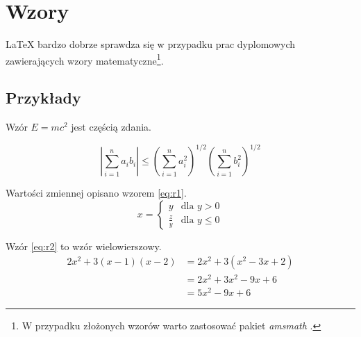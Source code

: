 \section{Wzory}
\LaTeX{} bardzo dobrze sprawdza się w przypadku prac dyplomowych zawierających wzory matematyczne\footnote{ W przypadku złożonych wzorów warto zastosować pakiet \emph{amsmath} \cite{amsmath}.}.
\subsection{Przykłady}
Wzór $E = mc^{2}$ jest częścią zdania.

\begin{equation}
    \left|\sum_{i=1}^n a_ib_i\right|
    \le
    \left(\sum_{i=1}^n a_i^2\right)^{1/2}
    \left(\sum_{i=1}^n b_i^2\right)^{1/2}
\end{equation}

Wartości zmiennej opisano wzorem \ref{eq:r1}.
\begin{equation}
    \label{eq:r1}
    x=\begin{cases}
        y           & \text{dla } y > 0    \\
        \frac{z}{y} & \text{dla } y \leq 0
    \end{cases}
\end{equation}

Wzór \ref{eq:r2} to wzór wielowierszowy.
\begin{align}
    \label{eq:r2}
    2x^2 + 3(x-1)(x-2) & =2x^2 + 3(x^2-3x+2)             \\
                       & = 2x^2 + 3x^2 - 9x + 6\nonumber \\
                       & = 5x^2 - 9x + 6\nonumber
\end{align}

